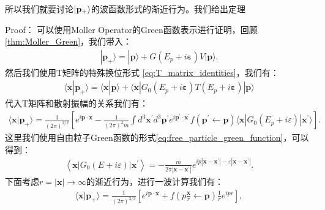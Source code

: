 
\bigskip
{}

所以我们就要讨论$ \ket{\mathbf{p}_+} $的波函数形式的渐近行为。我们给出定理

Proof： 可以使用Moller Operator的Green函数表示进行证明，回顾\cref{thm:Moller_Green}，我们带入：
\begin{align}
  |\mathbf{p}_+\rangle=|\mathbf{p}\rangle+G(E_p+i\boldsymbol{\varepsilon})V|\mathbf{p}\rangle.
\end{align}
然后我们使用T矩阵的特殊换位形式 \cref{eq:T_matrix_identities}，我们有：
\begin{align}
  \langle\mathbf{x}|\mathbf{p}_+\rangle=\langle\mathbf{x}|\mathbf{p}\rangle+\langle\mathbf{x}|G_0(E_p+i\boldsymbol{\varepsilon})T(E_p+i\boldsymbol{\varepsilon})|\mathbf{p}\rangle
\end{align}
代入T矩阵和散射振幅的关系我们有：
\begin{align}
  \langle\mathbf{x}|\mathbf{p}_+\rangle=\frac{1}{(2\pi)^{3/2}}\left[e^{i\mathbf{p}\cdot\mathbf{x}}-\frac{1}{(2\pi)^2m}\int
    d^3\mathbf{x}^{\prime}d^3\mathbf{p}^{\prime}e^{i\mathbf{p}^{\prime}\cdot\mathbf{x}^{\prime}}f(\mathbf{p}^{\prime}\leftarrow\mathbf{p})\langle
  \mathbf{x}|G_0(E_p+i\varepsilon)|\mathbf{x}^{\prime}\rangle\right].
\end{align}
这里我们使用自由粒子Green函数的形式\cref{eq:free_particle_green_function}，可以得到：
\begin{align}
  \left\langle\mathbf{x}|G_0(E+i{\varepsilon})|\mathbf{x}^{\prime}\right\rangle=-\frac{m}{2{\pi}|\mathbf{x}-\mathbf{x}^{\prime}|}e^{ip|\mathbf{x}-\mathbf{x}^{\prime}|-{\varepsilon}|\mathbf{x}-\mathbf{x}^{\prime}|}.
\end{align}
下面考虑$ r = |\mathbf{x}| \to \infty $的渐近行为，进行一波计算我们有：
\begin{align}
  \langle \mathbf{x}|\mathbf{p}_+\rangle
  =\frac{1}{(2\pi)^{3/2}}\left[e^{i\mathbf{p}\cdot\mathbf{x}}+f\left(p\frac{\mathbf{x}}{r}\leftarrow\mathbf{p}\right)\frac{1}{r}e^{ipr}\right],
\end{align}

